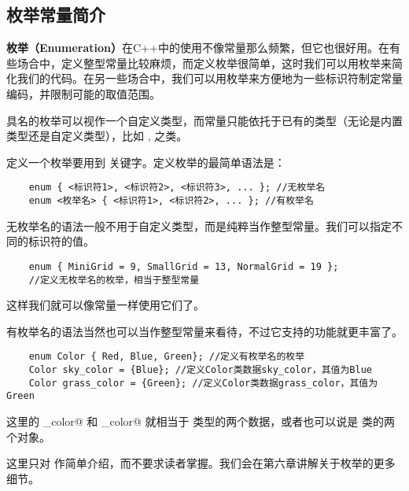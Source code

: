 \subsection*{枚举常量简介}
\textbf{枚举（Enumeration）}在C++中的使用不像常量那么频繁，但它也很好用。在有些场合中，定义整型常量比较麻烦，而定义枚举很简单，这时我们可以用枚举来简化我们的代码。在另一些场合中，我们可以用枚举来方便地为一些标识符制定常量编码，并限制可能的取值范围。\par
具名的枚举可以视作一个自定义类型，而常量只能依托于已有的类型（无论是内置类型还是自定义类型），比如 \lstinline@int@, \lstinline@double@ 之类。\par
定义一个枚举要用到 \lstinline@enum@ 关键字。定义枚举的最简单语法是：
\begin{lstlisting}
    enum { <标识符1>, <标识符2>, <标识符3>, ... }; //无枚举名
    enum <枚举名> { <标识符1>, <标识符2>, ... }; //有枚举名
\end{lstlisting}\par
无枚举名的语法一般不用于自定义类型，而是纯粹当作整型常量。我们可以指定不同的标识符的值。
\begin{lstlisting}
    enum { MiniGrid = 9, SmallGrid = 13, NormalGrid = 19 };
    //定义无枚举名的枚举，相当于整型常量
\end{lstlisting}
这样我们就可以像常量一样使用它们了。\par
有枚举名的语法当然也可以当作整型常量来看待，不过它支持的功能就更丰富了。
\begin{lstlisting}
    enum Color { Red, Blue, Green}; //定义有枚举名的枚举
    Color sky_color = {Blue}; //定义Color类数据sky_color，其值为Blue
    Color grass_color = {Green}; //定义Color类数据grass_color，其值为Green
\end{lstlisting}
这里的 \lstinline@sky_color@ 和 \lstinline@grass_color@ 就相当于 \lstinline@Color@ 类型的两个数据，或者也可以说是 \lstinline@Color@ 类的两个对象。\par
这里只对 \lstinline@enum@ 作简单介绍，而不要求读者掌握。我们会在第六章讲解关于枚举的更多细节。\par
